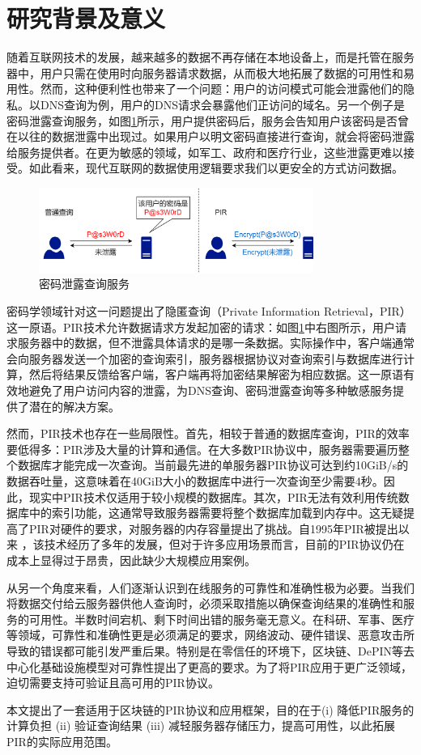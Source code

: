 \section{研究背景及意义}

随着互联网技术的发展，越来越多的数据不再存储在本地设备上，而是托管在服务器中，用户只需在使用时向服务器请求数据，从而极大地拓展了数据的可用性和易用性。然而，这种便利性也带来了一个问题：用户的访问模式可能会泄露他们的隐私。以DNS查询为例，用户的DNS请求会暴露他们正访问的域名。另一个例子是密码泄露查询服务，如图\ref{fig:password-query}所示，用户提供密码后，服务会告知用户该密码是否曾在以往的数据泄露中出现过。如果用户以明文密码直接进行查询，就会将密码泄露给服务提供者。在更为敏感的领域，如军工、政府和医疗行业，这些泄露更难以接受。如此看来，现代互联网的数据使用逻辑要求我们以更安全的方式访问数据。

\begin{figure}
    \centering
    \includegraphics[width=0.8\textwidth]{figure/密码查询服务.png}
    \caption{密码泄露查询服务}
    \label{fig:password-query}
\end{figure}

密码学领域针对这一问题提出了隐匿查询（Private Information Retrieval，PIR）这一原语。PIR技术允许数据请求方发起加密的请求：如图\ref{fig:password-query}中右图所示，用户请求服务器中的数据，但不泄露具体请求的是哪一条数据。实际操作中，客户端通常会向服务器发送一个加密的查询索引，服务器根据协议对查询索引与数据库进行计算，然后将结果反馈给客户端，客户端再将加密结果解密为相应数据。这一原语有效地避免了用户访问内容的泄露，为DNS查询、密码泄露查询等多种敏感服务提供了潜在的解决方案。

然而，PIR技术也存在一些局限性。首先，相较于普通的数据库查询，PIR的效率要低得多：PIR涉及大量的计算和通信。在大多数PIR协议中，服务器需要遍历整个数据库才能完成一次查询。当前最先进的单服务器PIR协议可达到约10GiB/s的数据吞吐量，这意味着在40GiB大小的数据库中进行一次查询至少需要4秒。因此，现实中PIR技术仅适用于较小规模的数据库。其次，PIR无法有效利用传统数据库中的索引功能，这通常导致服务器需要将整个数据库加载到内存中。这无疑提高了PIR对硬件的要求，对服务器的内存容量提出了挑战。自1995年PIR被提出以来 \cite{FOCS:CGKS95}，该技术经历了多年的发展，但对于许多应用场景而言，目前的PIR协议仍在成本上显得过于昂贵，因此缺少大规模应用案例。

从另一个角度来看，人们逐渐认识到在线服务的可靠性和准确性极为必要。当我们将数据交付给云服务器供他人查询时，必须采取措施以确保查询结果的准确性和服务的可用性。半数时间宕机、剩下时间出错的服务毫无意义。在科研、军事、医疗等领域，可靠性和准确性更是必须满足的要求，网络波动、硬件错误、恶意攻击所导致的错误都可能引发严重后果。特别是在零信任的环境下，区块链、DePIN等去中心化基础设施模型对可靠性提出了更高的要求。为了将PIR应用于更广泛领域，迫切需要支持可验证且高可用的PIR协议。

本文提出了一套适用于区块链的PIR协议和应用框架，目的在于(i) 降低PIR服务的计算负担 (ii) 验证查询结果 (iii) 减轻服务器存储压力，提高可用性，以此拓展PIR的实际应用范围。